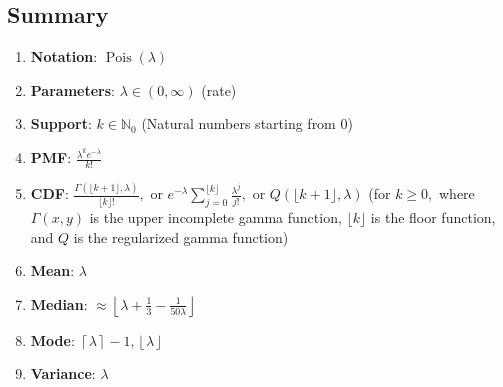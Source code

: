 \subsection{Summary}

\begin{enumerate}
    \item \textbf{Notation}: 
    $
         {\displaystyle \operatorname {Pois} (\lambda )}
    $
    \hfill \cite{wiki/Poisson_distribution}

    \item \textbf{Parameters}:
    ${\displaystyle \lambda \in (0,\infty )}$ (rate)
    \hfill \cite{wiki/Poisson_distribution}

    \item \textbf{Support}: 
    ${\displaystyle k\in \mathbb {N} _{0}}$ (Natural numbers starting from $0$)
    \hfill \cite{wiki/Poisson_distribution}

    \item \textbf{PMF}:
    $ 
         {\displaystyle {\frac {\lambda ^{k}e^{-\lambda }}{k!}}}
    $
    \hfill \cite{wiki/Poisson_distribution}

    \item \textbf{CDF}:
    ${\displaystyle {\frac {\Gamma (\lfloor k+1\rfloor ,\lambda )}{\lfloor k\rfloor !}},}$ or
    ${\displaystyle e^{-\lambda }\sum _{j=0}^{\lfloor k\rfloor }{\frac {\lambda ^{j}}{j!}},}$ or
    ${\displaystyle Q(\lfloor k+1\rfloor ,\lambda )}$
    (for ${\displaystyle k\geq 0,}$ where ${\displaystyle \Gamma (x,y)}$ is the upper incomplete gamma function, ${\displaystyle \lfloor k\rfloor }$ is the floor function, and ${\displaystyle Q}$ is the regularized gamma function)
    \hfill \cite{wiki/Poisson_distribution}

    \item \textbf{Mean}: 
    $ 
         {\displaystyle \lambda }
    $
    \hfill \cite{wiki/Poisson_distribution}

    \item \textbf{Median}: 
    $
         {\displaystyle \approx \left\lfloor \lambda +{\frac {1}{3}}-{\frac {1}{50\lambda }}\right\rfloor }
    $
    \hfill \cite{wiki/Poisson_distribution}

    \item \textbf{Mode}: 
    $
         {\displaystyle \left\lceil \lambda \right\rceil -1,\left\lfloor \lambda \right\rfloor }
    $
    \hfill \cite{wiki/Poisson_distribution}

    \item \textbf{Variance}: 
    $ 
         {\displaystyle \lambda }
    $
    \hfill \cite{wiki/Poisson_distribution}


\end{enumerate}
